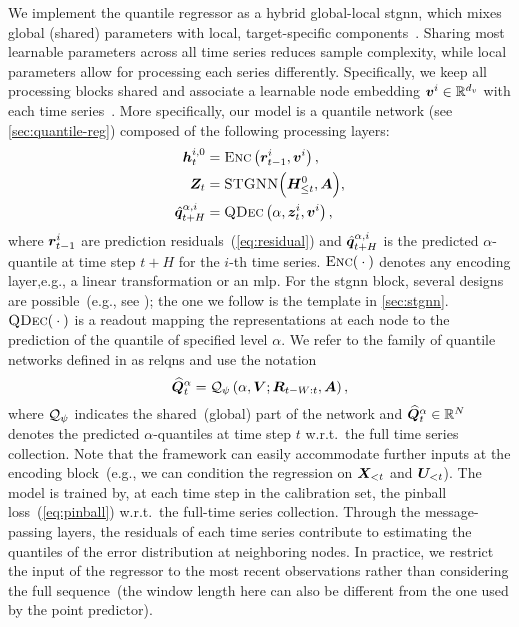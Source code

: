 We implement the quantile regressor as a hybrid global-local \gls{stgnn}, which mixes global (shared) parameters with local, target-specific components~\cite{smyl2020hybrid}. Sharing most learnable parameters across all time series reduces sample complexity, while local parameters allow for processing each series differently. Specifically, we keep all processing blocks shared and associate a learnable node embedding ${\bm{v}}^i \in {\mathbb{R}}^{d_v}$ with each time series~\cite{cini2023taming}.
More specifically, our model is a quantile network (see \autoref{sec:quantile-reg}) composed of the following processing layers:
\begingroup
\allowdisplaybreaks
\begin{align}
    {\bm{h}}^{i,0}_{t} &= \textsc{Enc}\left({\bm{r}}^i_{t-1},{\bm{v}}^i\right),\label{eq:enc}\\
    {\bm{Z}}_{t} &= \textsc{STGNN}\Big({\bm{H}}^{0}_{
    \leq t}, {\bm{A}}\Big),\label{eq:stmp-block}\\
    \hat {{\bm{q}}}^{\alpha,i}_{t+H} &= \textsc{QDec}\left(\alpha, {\bm{z}}_{t}^{i}, {\bm{v}}^i\right)\label{eq:dec},
\end{align}
\endgroup
where ${\bm{r}}^i_{t-1}$ are prediction residuals~(\autoref{eq:residual}) and  $\hat {{\bm{q}}}^{\alpha,i}_{t+H}$ is the predicted $\alpha$-quantile at time step $t+H$ for the $i$-th time series. $\textsc{Enc}({}\cdot{})$ denotes any encoding layer,e.g., a linear transformation or an \gls{mlp}. 
For the \gls{stgnn} block, several designs are possible~(e.g., see \citealt{jin2023survey}); the one we follow is the template in \autoref{sec:stgnn}.
$\textsc{QDec}({}\cdot{})$ is a readout mapping the representations at each node to the prediction of the quantile of specified level $\alpha$.
We refer to the family of quantile networks defined in  as \glspl{relqn} and use the notation
\begin{equation}\label{eq:quantile-estimator}
    \widehat {{\bm{Q}}}^\alpha_t = {\mathcal{Q}}_{\psi}\left(\alpha, {\bm{V}}; {\bm{R}}_{t-W:t}, {\bm{A}}\right),
\end{equation}
where ${\mathcal{Q}}_{\psi}$ indicates the shared~(global) part of the network and $\widehat {{\bm{Q}}}^\alpha_t \in {\mathbb{R}}^N$ denotes the predicted $\alpha$-quantiles at time step $t$ w.r.t.\ the full time series collection. Note that the framework can easily accommodate further inputs at the encoding block~(e.g., we can condition the regression on ${\bm{X}}_{<t}$ and ${\bm{U}}_{<t}$). 
The model is trained by, at each time step in the calibration set, the pinball loss~(\autoref{eq:pinball}) w.r.t.\ the full-time series collection. 
Through the message-passing layers, the residuals of each time series contribute to estimating the quantiles of the error distribution at neighboring nodes. In practice, we restrict the input of the regressor to the most recent observations rather than considering the full sequence~(the window length here can also be different from the one used by the point predictor).

